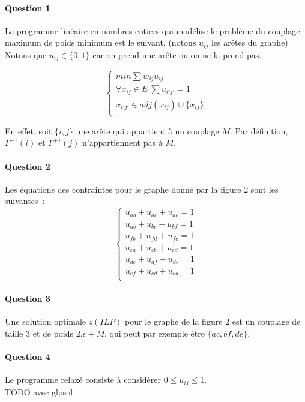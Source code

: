\paragraph{Question 1}Le programme linéaire en nombres entiers qui modélise le
  problème du couplage maximum de poids minimum est le suivant.
  (notons $u_{ij}$ les arêtes du graphe)
Notons que $u_{ij} \in \{0, 1\}$ car on prend une arête ou on ne la
prend pas.

\begin{equation}
\begin{cases}
min \sum w_{ij} u_{ij} \\
\forall x_{ij} \in E ~ \sum u_{i' j'} = 1 \\
 x_{i' j'} \in adj(x_{ij}) \cup \{ x_{ij} \} \\
\end{cases}
\end{equation}

En effet, soit $\{ i, j \}$ une arête qui appartient à un couplage
$M$. Par définition, $\Gamma^{-1}(i) $ et $\Gamma^{+1}(j)$
n'appartiennent pas à $M$.

\paragraph{Question 2}
Les équations des contraintes pour le graphe donné par la figure 2
sont les suivantes~:
\begin{equation}
\begin{cases}
u_{ab}+u_{ac}+u_{ae}=1 \\
u_{ab}+u_{bc}+u_{bf}=1 \\
u_{fb}+u_{fd}+u_{fe}=1 \\
u_{ca}+u_{cb}+u_{cd}=1 \\
u_{dc}+u_{df}+u_{de}=1 \\
u_{ef}+u_{ed}+u_{ea}=1 \\
\end{cases}
\end{equation}

\paragraph{Question 3}
Une solution optimale $z(ILP)$ pour le graphe de la figure 2 est un
couplage de taille 3 et de poids $2.\epsilon + M$, qui peut par
exemple être $\{
ac, bf, de \}$. 

\paragraph{Question 4}
Le programme relaxé consiste à considérer $0 \leq u_{ij} \leq 1$. \\
TODO avec glpsol
